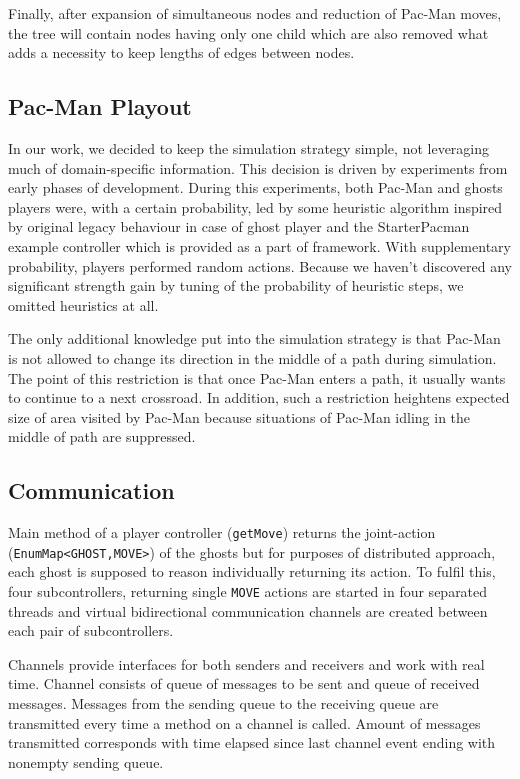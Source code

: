 Finally, after expansion of simultaneous nodes and reduction of Pac-Man moves, the tree
will contain nodes having only one child which are also removed what adds a necessity to keep
lengths of edges between nodes.


\subsection{Pac-Man Playout}

In our work, we decided to keep the simulation strategy simple, not leveraging much of
domain-specific information. This decision is driven by experiments from early phases of
development. During this experiments, both Pac-Man and ghosts players were, with a certain
probability, led by some heuristic algorithm inspired by original legacy behaviour in case of
ghost player and the StarterPacman example controller which is provided as a part of framework.
With supplementary probability, players performed random actions. Because we haven't discovered
any significant strength gain by tuning of the probability of heuristic steps, we omitted
heuristics at all.

The only additional knowledge put into the simulation strategy is that Pac-Man is not allowed
to change its direction in the middle of a path during simulation. The point of this 
restriction is that once Pac-Man enters a path, it usually wants to continue to a next
crossroad. In addition, such a restriction heightens expected size of area visited by Pac-Man
because situations of Pac-Man idling in the middle of path are suppressed.


\subsection{Communication}

Main method of a player controller (\texttt{getMove}) returns the joint-action
(\texttt{EnumMap<GHOST,MOVE>}) of the ghosts
but for purposes of distributed approach, each ghost is supposed to reason individually 
returning its action. To fulfil this, four subcontrollers, returning single \texttt{MOVE}
actions are started in four separated threads and virtual bidirectional communication 
channels are created between each pair of subcontrollers.

Channels provide interfaces for both senders and receivers and work with real time. Channel
consists of queue of messages to be sent and queue of received messages. Messages from the
sending queue to the receiving queue are transmitted every time a method on a channel is
called. Amount of messages transmitted corresponds with time elapsed since last channel event
ending with nonempty sending queue.


